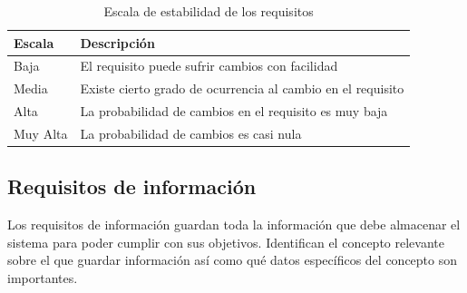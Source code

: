 \begin{table}[htpb]
\centering
\begin{tabularx}{\textwidth}{|l|X|}
\hline
\rowcolor[gray]{0.9}\textbf{Escala}   & \textbf{Descripción}                                                 \\ \hline
Baja     & El requisito puede sufrir cambios con facilidad             \\ \hline
Media    & Existe cierto grado de ocurrencia al cambio en el requisito \\ \hline
Alta     & La probabilidad de cambios en el requisito es muy baja      \\ \hline
Muy Alta & La probabilidad de cambios es casi nula                     \\ \hline
\end{tabularx}
\caption{Escala de estabilidad de los requisitos}
\label{esc_estab}
\end{table}


\subsection{Requisitos de información}


Los requisitos de información guardan toda la información que debe almacenar el sistema para poder cumplir con sus objetivos. Identifican el concepto relevante sobre el que guardar información así como qué datos específicos del concepto son importantes.


